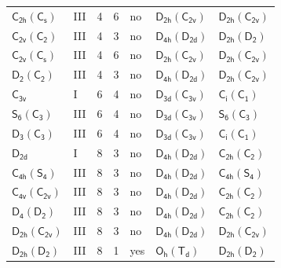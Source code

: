 \documentclass[10pt,a4paper]{article}
\numberwithin{equation}{section}
\newcommand{\grp}[1]{\mathsf{#1}}
\begin{document}
{\begin{longtable}{@{}llrrlll@{}}
\href{C2h-C1v.pdf}{$\grp{C_{2h}}(\grp{C_{s}})$} & III & 4 & 6 & no & \href{D2h-C2v.pdf}{$\grp{D_{2h}}(\grp{C_{2v}})$} & \href{D2h-C2v.pdf}{$\grp{D_{2h}}(\grp{C_{2v}})$}\\
\href{C2v-C2.pdf}{$\grp{C_{2v}}(\grp{C_{2}})$} & III & 4 & 3 & no & \href{D4h-D2d.pdf}{$\grp{D_{4h}}(\grp{D_{2d}})$} & \href{D2h-D2.pdf}{$\grp{D_{2h}}(\grp{D_{2}})$}\\
\href{C2v-C1v.pdf}{$\grp{C_{2v}}(\grp{C_{s}})$} & III & 4 & 6 & no & \href{D2h-C2v.pdf}{$\grp{D_{2h}}(\grp{C_{2v}})$} & \href{D2h-C2v.pdf}{$\grp{D_{2h}}(\grp{C_{2v}})$}\\
\href{D2-C2.pdf}{$\grp{D_{2}}(\grp{C_{2}})$} & III & 4 & 3 & no & \href{D4h-D2d.pdf}{$\grp{D_{4h}}(\grp{D_{2d}})$} & \href{D2h-C2v.pdf}{$\grp{D_{2h}}(\grp{C_{2v}})$}\\
\href{../../../rotation/data/pdf/C3v.pdf}{$\grp{C_{3v}}$} & I & 6 & 4 & no & \href{D3d-C3v.pdf}{$\grp{D_{3d}}(\grp{C_{3v}})$} & \href{S2-C1.pdf}{$\grp{C_{i}}(\grp{C_{1}})$}\\
\href{S6-C3.pdf}{$\grp{S_{6}}(\grp{C_{3}})$} & III & 6 & 4 & no & \href{D3d-C3v.pdf}{$\grp{D_{3d}}(\grp{C_{3v}})$} & \href{S6-C3.pdf}{$\grp{S_{6}}(\grp{C_{3}})$}\\
\href{D3-C3.pdf}{$\grp{D_{3}}(\grp{C_{3}})$} & III & 6 & 4 & no & \href{D3d-C3v.pdf}{$\grp{D_{3d}}(\grp{C_{3v}})$} & \href{S2-C1.pdf}{$\grp{C_{i}}(\grp{C_{1}})$}\\
\href{../../../rotation/data/pdf/D2d.pdf}{$\grp{D_{2d}}$} & I & 8 & 3 & no & \href{D4h-D2d.pdf}{$\grp{D_{4h}}(\grp{D_{2d}})$} & \href{C2h-C2.pdf}{$\grp{C_{2h}}(\grp{C_{2}})$}\\
\href{C4h-S4.pdf}{$\grp{C_{4h}}(\grp{S_{4}})$} & III & 8 & 3 & no & \href{D4h-D2d.pdf}{$\grp{D_{4h}}(\grp{D_{2d}})$} & \href{C4h-S4.pdf}{$\grp{C_{4h}}(\grp{S_{4}})$}\\
\href{C4v-C2v.pdf}{$\grp{C_{4v}}(\grp{C_{2v}})$} & III & 8 & 3 & no & \href{D4h-D2d.pdf}{$\grp{D_{4h}}(\grp{D_{2d}})$} & \href{C2h-C2.pdf}{$\grp{C_{2h}}(\grp{C_{2}})$}\\
\href{D4-D2.pdf}{$\grp{D_{4}}(\grp{D_{2}})$} & III & 8 & 3 & no & \href{D4h-D2d.pdf}{$\grp{D_{4h}}(\grp{D_{2d}})$} & \href{C2h-C2.pdf}{$\grp{C_{2h}}(\grp{C_{2}})$}\\
\href{D2h-C2v.pdf}{$\grp{D_{2h}}(\grp{C_{2v}})$} & III & 8 & 3 & no & \href{D4h-D2d.pdf}{$\grp{D_{4h}}(\grp{D_{2d}})$} & \href{D2h-C2v.pdf}{$\grp{D_{2h}}(\grp{C_{2v}})$}\\
\href{D2h-D2.pdf}{$\grp{D_{2h}}(\grp{D_{2}})$} & III & 8 & 1 & yes & \href{Oh-Td.pdf}{$\grp{O_{h}}(\grp{T_{d}})$} & \href{D2h-D2.pdf}{$\grp{D_{2h}}(\grp{D_{2}})$}\\

\end{longtable}}
\end{document}

